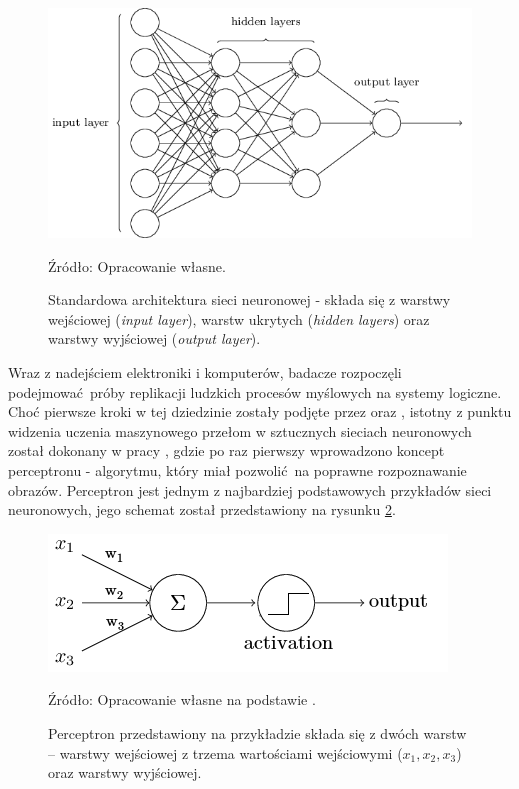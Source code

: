 \documentclass[12pt,a4paper,twoside]{article}
\newcommand{\source}[1]{\caption*{\hfill Źródło: {#1}} }
\begin{document}
\begin{figure}[h]
  \centering
\includegraphics[scale=0.4]{../obrazy/fig:NN.png}
\caption{Standardowa architektura sieci neuronowej - składa się z warstwy wejściowej (\textit{input layer}), warstw ukrytych (\textit{hidden layers}) oraz warstwy wyjściowej  (\textit{output layer}).\label{fig:NN}}
\source{Opracowanie własne.}
\end{figure}

Wraz z nadejściem elektroniki i komputerów, badacze rozpoczęli podejmować próby replikacji ludzkich procesów myślowych na systemy logiczne. Choć pierwsze kroki w tej dziedzinie zostały podjęte przez \citet{mcculloch1943} oraz \citet{hebb1949}, istotny z punktu widzenia uczenia maszynowego przełom w sztucznych sieciach neuronowych został dokonany w pracy \citet{rosenblatt1957}, gdzie po raz pierwszy wprowadzono koncept perceptronu - algorytmu, który miał pozwolić na poprawne rozpoznawanie obrazów. Perceptron jest jednym z najbardziej podstawowych przykładów sieci neuronowych, jego schemat został przedstawiony na rysunku \ref{fig:perceptron}.

\begin{figure}[h]
  \centering
\includegraphics[scale=0.4]{../obrazy/fig:perceptron.png}
\caption{Perceptron przedstawiony na przykładzie składa się z dwóch warstw – warstwy wejściowej z trzema wartościami wejściowymi (\(x_1, x_2, x_3 \)) oraz warstwy wyjściowej.\label{fig:perceptron}}
\source{Opracowanie własne na podstawie \citet{rosenblatt1957}.}
\end{figure}
\end{document}
